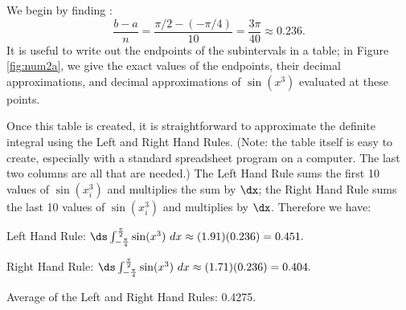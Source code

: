 \begin{solution}
{We begin by finding \dx:
$$\frac{b-a}{n} = \frac{\pi/2 - (-\pi/4)}{10} = \frac{3\pi}{40}\approx 0.236.$$
It is useful to write out the endpoints of the subintervals in a table; in Figure \ref{fig:num2a}, we give the exact values of the endpoints, their decimal approximations, and decimal approximations of $\sin(x^3)$ evaluated at these points. 

Once this table is created, it is straightforward to approximate the definite integral using the Left and Right Hand Rules. (Note: the table itself is easy to create, especially with a standard spreadsheet program on a computer. The last two columns are all that are needed.) The Left Hand Rule sums the first 10 values of $\sin(x_i^3)$ and multiplies the sum by $\dx$; the Right Hand Rule sums the last 10 values of $\sin(x_i^3)$ and multiplies by $\dx$. Therefore we have:

Left Hand Rule: $\ds \int_{-\frac{\pi}4}^{\frac{\pi}2}\sin(x^3)\ dx \approx (1.91)(0.236) = 0.451.$

Right Hand Rule: $\ds \int_{-\frac{\pi}4}^{\frac{\pi}2}\sin(x^3)\ dx \approx (1.71)(0.236) = 0.404.$

Average of the Left and Right Hand Rules: 0.4275.


}
\end{solution}
